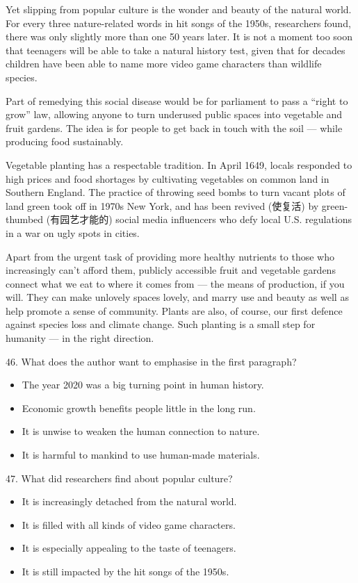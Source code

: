 \documentclass[UTF8,11pt]{ctexart}
\begin{document}
Yet slipping from popular culture is the wonder and beauty of the natural world. For every three nature-related words in hit songs of the 1950s, researchers found, there was only slightly more than one 50 years later. It is not a moment too soon that teenagers will be able to take a natural history test, given that for decades children have been able to name more video game characters than wildlife species.


Part of remedying this social disease would be for parliament to pass a “right to grow” law, allowing anyone to turn underused public spaces into vegetable and fruit gardens. The idea is for people to get back in touch with the soil — while producing food sustainably.


Vegetable planting has a respectable tradition. In April 1649, locals responded to high prices and food shortages by cultivating vegetables on common land in Southern England. The practice of throwing seed bombs to turn vacant plots of land green took off in 1970s New York, and has been revived (使复活) by green-thumbed (有园艺才能的) social media influencers who defy local U.S. regulations in a war on ugly spots in cities.


Apart from the urgent task of providing more healthy nutrients to those who increasingly can’t afford them, publicly accessible fruit and vegetable gardens connect what we eat to where it comes from — the means of production, if you will. They can make unlovely spaces lovely, and marry use and beauty as well as help promote a sense of community. Plants are also, of course, our first defence against species loss and climate change. Such planting is a small step for humanity — in the right direction.


46. What does the author want to emphasise in the first paragraph?


\begin{itemize}[leftmargin=2em,itemsep=.2em,topsep=.4em]\item[A.] The year 2020 was a big turning point in human history.
\item[B.] Economic growth benefits people little in the long run.
\item[C.] It is unwise to weaken the human connection to nature.
\item[D.] It is harmful to mankind to use human-made materials.
\end{itemize}

47. What did researchers find about popular culture?


\begin{itemize}[leftmargin=2em,itemsep=.2em,topsep=.4em]\item[A.] It is increasingly detached from the natural world.
\item[B.] It is filled with all kinds of video game characters.
\item[C.] It is especially appealing to the taste of teenagers.
\item[D.] It is still impacted by the hit songs of the 1950s.
\end{itemize}
\end{document}

